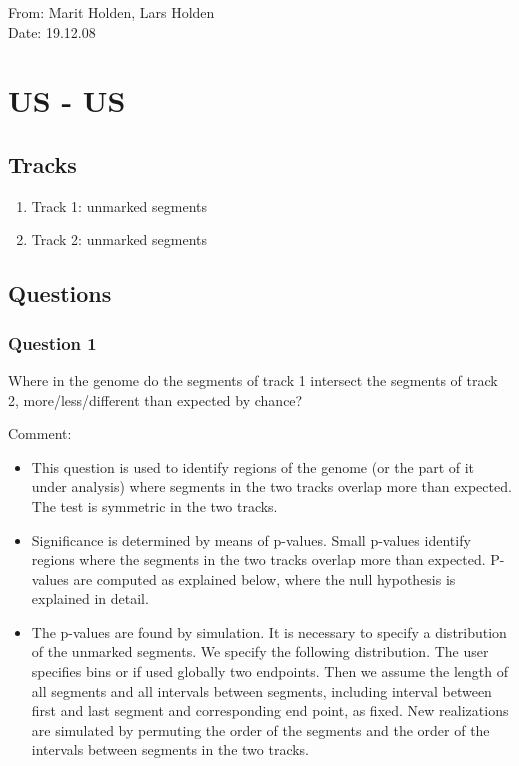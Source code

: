 \documentclass{article}
\begin{document}
From: Marit Holden, Lars Holden \\
\hspace{4mm} Date: 19.12.08

\section {US - US }

\subsection {Tracks}

\begin{enumerate}
	\item Track 1: unmarked segments
	\item Track 2: unmarked segments
\end{enumerate}

\subsection{Questions}

\subsubsection{Question 1}

Where in the genome do the segments of track 1 intersect the segments of track 2, more/less/different than expected by chance?



\vspace{5mm}
 Comment:

\begin{itemize}
	\item This question is used to identify regions of the genome (or the part of it under analysis) where 
segments in the two tracks overlap more than expected. 
The test is symmetric in the two tracks. 
	\item Significance is determined by means of p-values. Small p-values identify regions where the segments
in the two tracks overlap more than expected.  P-values are computed as explained below, where the null hypothesis is explained in detail.
	\item The p-values are found by simulation. It is necessary to specify a distribution of the unmarked 
segments. We specify the following distribution. The user specifies bins or if used globally two endpoints. Then we 
assume the length of all segments and all intervals between segments, including interval between first and last
segment and corresponding end point, as fixed. New realizations are simulated by permuting the order of the 
segments and the order of the intervals between segments in the two tracks.   
\end{itemize}
\end{document}
